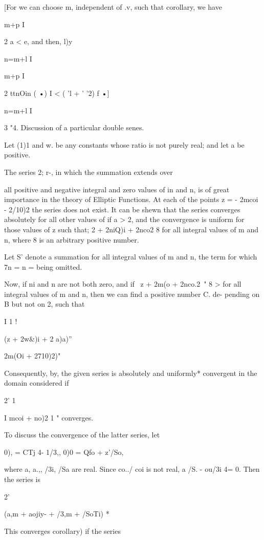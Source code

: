 %
%

[For we can choose m, independent of .v, such that corollary, we have

m+p I

2 a < e, and then, l)y

n=m+l I

m+p I

2 ttnOin ( •) I < ( 'l + ' '2) f •]

n=m+l I

3 "4. Discussion of a particular double senes.

Let (1)1 and w. be any constants whose ratio is not purely real; and
let a be positive.

The series 2; r-, in which the summation extends over

all positive and negative integral and zero values of in and n, is of
great importance in the theory of Elliptic Functions. At each of the
points z = - 2mcoi - 2/10)2 the series does not exist. It can be shewn
that the series converges absolutely for all other values of if a > 2,
and the convergence is uniform for those values of z such that; 2 +
2niQ)i + 2nco2 8 for all integral values of m and n, where 8 is an
arbitrary positive number.

Let S' denote a summation for all integral values of m and n, the term
for which 7n = n = being omitted.

Now, if ni and n are not both zero, and if \ z + 2m(o + 2nco.2\ " 8 >
for all integral values of m and n, then we can find a positive number
C. de- pending on B but not on 2, such that

I 1 !

(z + 2w\&)i + 2 a)a)''

 2m(Oi + 2710)2)"

Consequently, by, the given series is absolutely and uniformly*
convergent in the domain considered if

2' 1

I mcoi + no)2 1 " converges.

To discuss the convergence of the latter series, let

0), = CTj 4- 1/3,, 0)0 = Qfo + z'/So,

where a, a.,, /3i, /Sa are real. Since co../ coi is not real, a /S. -
ou/3i 4= 0. Then the series is

2'

 (a,m + aojiy- + /3,m + /SoTi) *

This converges  corollary) if the series


